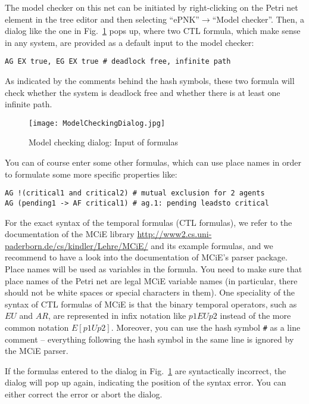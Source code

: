 The model checker on this net can be initiated by right-clicking
on the Petri net element in the tree editor and then selecting 
``ePNK''$\rightarrow$``Model checker''. Then, a dialog like the
one in Fig.~\ref{fig:user:modelchecker-dialog} pops up, where
two CTL formula, which make sense in any system, are provided
as a default input to the model checker:  
\begin{verbatim}
AG EX true, EG EX true # deadlock free, infinite path
\end{verbatim}
As indicated by the comments behind the hash symbols, these two
formula will check whether the system is deadlock free and whether
there is at least one infinite path.
%
\begin{figure}[hbt!!]
  \centerline{\texttt{[image: ModelCheckingDialog.jpg]}}
  \caption{Model checking dialog: Input of formulas}
  \label{fig:user:modelchecker-dialog}
\end{figure}
%
You can of course enter some other formulas, which can use place
names in order to formulate some more specific properties like:
\begin{verbatim}
AG !(critical1 and critical2) # mutual exclusion for 2 agents
AG (pending1 -> AF critical1) # ag.1: pending leadsto critical
\end{verbatim}
For the exact syntax of the temporal formulas (CTL formulas), we refer
to the documentation of the MCiE library
\url{http://www2.cs.uni-paderborn.de/cs/kindler/Lehre/MCiE/} and its
example formulas, and we recommend to have a look into the documentation
of MCiE's parser package. Place names will be used as variables in the formula.
You need to make sure that place names of the Petri net are legal MCiE variable
names (in particular, there should not be white spaces or special characters
in them). One speciality of the syntax of CTL formulas of MCiE is that the
binary temporal operators, such as $EU$ and $AR$, are represented in infix
notation like $p1 EU p2$ instead of the more common notation $E[ p1 U p2]$.
Moreover, you can use the hash symbol \verb+#+ as a line comment --
everything following the hash symbol in the same line is ignored by the
MCiE parser. 

If the formulas entered to the dialog in
Fig.~\ref{fig:user:modelchecker-dialog} are syntactically incorrect, the
dialog will pop up again, indicating the position of the syntax error.
You can either correct the error or abort the dialog.

